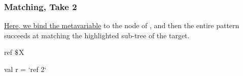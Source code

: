 \documentclass[aspectratio=169, handout]{beamer}
\newcommand{\dollar}{\mbox{\textdollar}}
\begin{document}
\begin{frame}[fragile]
  \frametitle{Matching, Take 2}

  \begin{center}
    \begin{minipage}[t][0.21\textheight][t]{\textwidth}
      \raggedright
      {\color{blue}\href{https://semgrep.dev/playground/s/07Ob}{Here, we bind the metavariable}} \code{$\dollar$X} to the node of ,
      and then the entire pattern succeeds at matching the highlighted sub-tree
      of the target.
    \end{minipage}
    \begin{minipage}[t][0.515\textheight][t]{\textwidth}
      \begin{minipage}{0.48\textwidth}
        \centering
      \end{minipage}
      \begin{minipage}{0.48\textwidth}
        \centering
      \end{minipage}
    \end{minipage}
    \begin{minipage}[t][0.3\textheight][t]{\textwidth}
      \begin{minipage}{0.48\textwidth}
        \centering
        \begin{codeblock}
          ref $\dollar$X
        \end{codeblock}
      \end{minipage}
      \begin{minipage}{0.48\textwidth}
        \begin{codeblock}
          val r = `ref 2`
        \end{codeblock}
      \end{minipage}
    \end{minipage}
  \end{center}
\end{frame}
\end{document}
